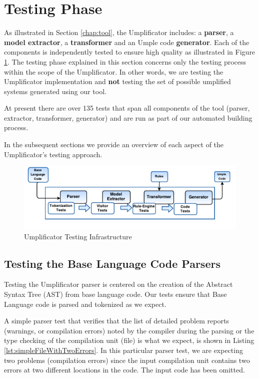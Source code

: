 \section{Testing Phase}
\label{sec:testingUmplificator}
As illustrated in Section \ref{chap:tool}, the Umplificator includes: a \textbf{parser}, a \textbf{model extractor}, a \textbf{transformer} and an Umple code \textbf{generator}. Each of the components is independently tested to ensure high quality as illustrated in Figure \ref{fig:testingPhase}. The testing phase explained in this section concerns only the testing process within the scope of the Umplificator.  In other words, we are testing the Umplificator implementation and \textbf{not} testing the set of possible umplified systems generated using our tool. 

At present there are over 135 tests that span all components of the tool (parser, extractor, transformer, generator) and are run as part of our automated building process.

In the subsequent sections we provide an overview of each aspect of the Umplificator's testing approach. 

\begin{figure}[h]
\centering
\includegraphics[width=1\textwidth]{Figures/testingPhase.pdf} 
\caption{Umplificator Testing Infrastructure}
\label{fig:testingPhase}
\end{figure}

\subsection{Testing the Base Language Code Parsers}

Testing the Umplificator parser is centered on the creation of the Abstract Syntax Tree (AST) from base language code. Our tests ensure that Base Language code is parsed and tokenized as we expect.

A simple parser test that verifies that the list of detailed problem reports (warnings, or compilation errors) noted by the compiler during the parsing or the type checking of the compilation unit (file) is what we expect, is shown in Listing \ref{lst:simpleFileWithTwoErrors}.
In this particular parser test, we are expecting two problems (compilation errors) since the input compilation unit contains two errors at two different locations in the code. The input code has been omitted. 

